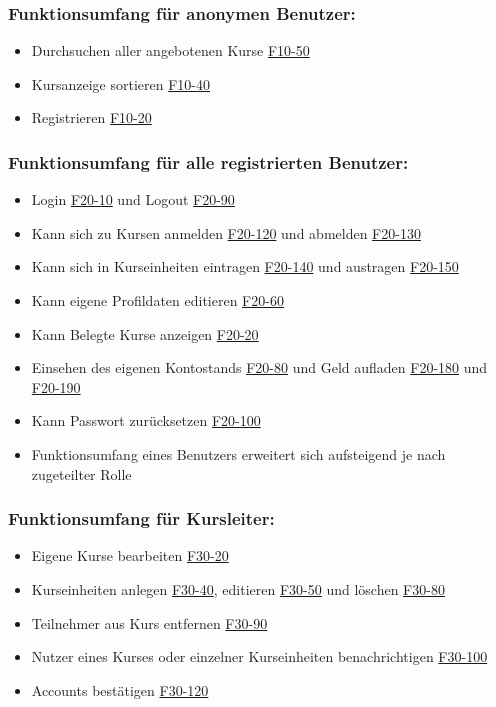 \documentclass[a4paper]{scrreprt}
\begin{document}
     	\subsubsection{Funktionsumfang für anonymen Benutzer:}
       		\begin{itemize}
	      		\item Durchsuchen aller angebotenen Kurse \hyperlink{kursSuche}{F10-50}
	      		\item Kursanzeige sortieren \hyperlink{kursAnzSort}{F10-40}
	       		\item Registrieren \hyperlink{Registrieren}{F10-20}
       		\end{itemize}
     	\subsubsection{Funktionsumfang für alle registrierten Benutzer:}
			\begin{itemize}
				\item Login \hyperlink{login}{F20-10} und Logout \hyperlink{logout}{F20-90}
				\item Kann sich zu Kursen anmelden \hyperlink{kursAnmelden}{F20-120} und abmelden \hyperlink{kursAbmelden}{F20-130}
				\item Kann sich in Kurseinheiten eintragen \hyperlink{kurseinheitAnmelden}{F20-140} und austragen \hyperlink{kurseinheitAbmelden}{F20-150}
				\item Kann eigene Profildaten editieren \hyperlink{profilEdit}{F20-60}
				\item Kann Belegte Kurse anzeigen \hyperlink{kurseAnzeigen}{F20-20}
				\item Einsehen des eigenen Kontostands \hyperlink{kontoAnzeigen}{F20-80} und Geld aufladen \hyperlink{kontoAufladenOn}{F20-180} und \hyperlink{kontoAufladenOff}{F20-190}
				\item Kann Passwort zurücksetzen \hyperlink{passwort}{F20-100}
				\item Funktionsumfang eines Benutzers erweitert sich aufsteigend je nach zugeteilter Rolle
			\end{itemize}
		\subsubsection{Funktionsumfang für Kursleiter:}
			\begin{itemize}
				\item Eigene Kurse bearbeiten \hyperlink{kursEdit}{F30-20}
				\item Kurseinheiten anlegen \hyperlink{kurseinheitAnlegen}{F30-40}, editieren \hyperlink{kurseinheitEdit}{F30-50} und löschen \hyperlink{kurseinheitLoeschen}{F30-80}
				\item Teilnehmer aus Kurs entfernen \hyperlink{kursUserDel}{F30-90}
				\item Nutzer eines Kurses oder einzelner Kurseinheiten benachrichtigen \hyperlink{kursUserMsg}{F30-100}
				\item Accounts bestätigen \hyperlink{addUserKL}{F30-120}
			\end{itemize}
\end{document}
